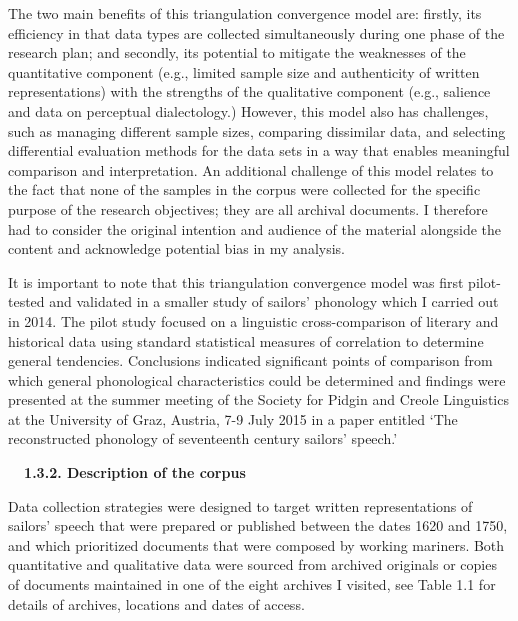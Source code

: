 \begin{styleNormali}
The two main benefits of this triangulation convergence model are: firstly, its efficiency in that data types are collected simultaneously during one phase of the research plan; and secondly, its potential to mitigate the weaknesses of the quantitative component (e.g., limited sample size and authenticity of written representations) with the strengths of the qualitative component (e.g., salience and data on perceptual dialectology.) However, this model also has challenges, such as managing different sample sizes, comparing dissimilar data, and selecting differential evaluation methods for the data sets in a way that enables meaningful comparison and interpretation. An additional challenge of this model relates to the fact that none of the samples in the corpus were collected for the specific purpose of the research objectives; they are all archival documents. I therefore had to consider the original intention and audience of the material alongside the content and acknowledge potential bias in my analysis. 
\end{styleNormali}


\begin{styleNormali}
It is important to note that this triangulation convergence model was first pilot-tested and validated in a smaller study of sailors’ phonology which I carried out in 2014. The pilot study focused on a linguistic cross-comparison of literary and historical data using standard statistical measures of correlation to determine general tendencies. Conclusions indicated significant points of comparison from which general phonological characteristics could be determined and findings were presented at the summer meeting of the Society for Pidgin and Creole Linguistics at the University of Graz, Austria, 7-9 July 2015 in a paper entitled ‘The reconstructed phonology of seventeenth century sailors’ speech.’
\end{styleNormali}


\begin{styleNormali}
\textbf{\ \ 1.3.2. Description of the corpus}
\end{styleNormali}


\begin{styleNormali}
Data collection strategies were designed to target written representations of sailors’ speech that were prepared or published between the dates 1620 and 1750, and which prioritized documents that were composed by working mariners. Both quantitative and qualitative data were sourced from archived originals or copies of documents maintained in one of the eight archives I visited, see Table 1.1 for details of archives, locations and dates of access.
\end{styleNormali}


